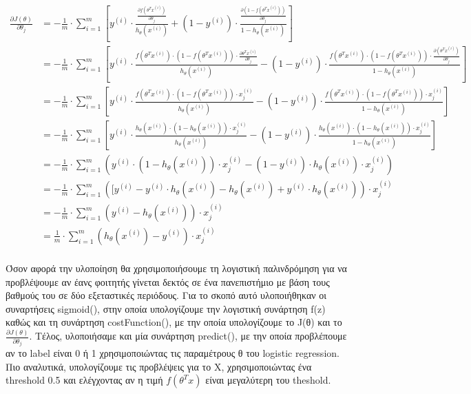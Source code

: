 \documentclass{article}
\begin{document}
	\begin{align*}
		\frac{\partial J(θ)}{\partial θ_{j}} 
		&= -\frac{1}{m} \cdot \sum_{i=1}^{m} \left[ y^{(i)} \cdot \frac{ \frac{\partial f(θ^{Τ}x^{(i)})}{\partial θ_{j}}}{h_{θ}(x^{(i)})} + 	
				(1 - y^{(i)}) \cdot \frac{ \frac{\partial (1 - f(θ^{Τ}x^{(i)}))}{\partial θ_{j}}}{1 - h_{θ}(x^{(i)})} \right] \\
		&= -\frac{1}{m} \cdot \sum_{i=1}^{m} \left[ y^{(i)} \cdot \frac{ f(θ^{Τ}x^{(i)}) \cdot (1 - f(θ^{Τ}x^{(i)})) \cdot \frac{\partial θ^{Τ}x^{(i)}}{\partial θ_{j}}}{h_{θ}(x^{(i)})} - 
			(1 - y^{(i)}) \cdot \frac{ f(θ^{Τ}x^{(i)}) \cdot (1 - f(θ^{Τ}x^{(i)})) \cdot \frac{\partial (θ^{Τ}x^{(i)})}{\partial θ_{j}}}{1 - h_{θ}(x^{(i)})} \right]\\
		&= -\frac{1}{m} \cdot \sum_{i=1}^{m} \left[ y^{(i)} \cdot \frac{ f(θ^{Τ}x^{(i)}) \cdot (1 - f(θ^{Τ}x^{(i)})) \cdot x^{(i)}_{j}}{h_{θ}(x^{(i)})} - 
			(1 - y^{(i)}) \cdot \frac{ f(θ^{Τ}x^{(i)}) \cdot (1 - f(θ^{Τ}x^{(i)})) \cdot x^{(i)}_{j}}{1 - h_{θ}(x^{(i)})} \right]\\
		&= -\frac{1}{m} \cdot \sum_{i=1}^{m} \left[ y^{(i)} \cdot \frac{ h_{θ}(x^{(i)}) \cdot (1 - h_{θ}(x^{(i)})) \cdot x^{(i)}_{j}}{h_{θ}(x^{(i)})} - 
			(1 - y^{(i)}) \cdot \frac{ h_{θ}(x^{(i)}) \cdot (1 - h_{θ}(x^{(i)})) \cdot x^{(i)}_{j}}{1 - h_{θ}(x^{(i)})} \right]\\
		&= -\frac{1}{m} \cdot \sum_{i=1}^{m} \left( y^{(i)} \cdot (1 - h_{θ}(x^{(i)})) \cdot x^{(i)}_{j} - (1 - y^{(i)}) \cdot h_{θ}(x^{(i)}) \cdot x^{(i)}_{j} \right)\\
		&= -\frac{1}{m} \cdot \sum_{i=1}^{m} \left( [y^{(i)} - y^{(i)} \cdot h_{θ}(x^{(i)}) - h_{θ}(x^{(i)})  + y^{(i)} \cdot h_{θ}(x^{(i)})  \right) \cdot x^{(i)}_{j}\\
		&= -\frac{1}{m} \cdot \sum_{i=1}^{m} \left( y^{(i)} - h_{θ}(x^{(i)}) \right) \cdot x^{(i)}_{j}\\
		&= \frac{1}{m} \cdot \sum_{i=1}^{m} \left( h_{θ}(x^{(i)}) - y^{(i)} \right) \cdot x^{(i)}_{j}\\
\end{align*}


	\noindent
	Όσον αφορά την υλοποίηση θα χρησιμοποιήσουμε τη λογιστική παλινδρόμηση για να προβλέψουμε αν έανς φοιτητής γίνεται δεκτός σε ένα πανεπιστήμιο με βάση τους βαθμούς του σε δύο εξεταστικές περιόδους. Για το σκοπό αυτό υλοποιήθηκαν οι συναρτήσεις sigmoid(), στην οποία υπολογίζουμε την λογιστική συνάρτηση f(z) καθώς και τη συνάρτηση costFunction(), με την οποία υπολογίζουμε το J(θ) και το $\frac{\partial J(θ)}{\partial θ_{j}} $. Tέλος, υλοποιήσαμε και μία συνάρτηση predict(), με την οποία προβλέπουμε αν το label είναι 0 ή 1 χρησιμοποιώντας τις παραμέτρους θ του logistic regression. Πιο αναλυτικά, υπολογίζουμε τις προβλέψεις για το X, χρησιμοποιώντας ένα threshold 0.5 και ελέγχοντας αν η τιμή $f(θ^{Τ}x)$ είναι μεγαλύτερη του theshold.\\
	
\end{document}
